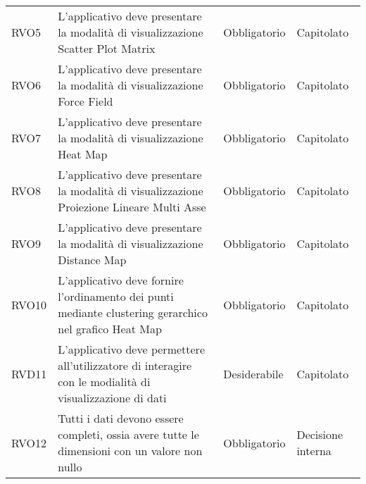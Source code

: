 \begin{longtable}[H]{>{\raggedright\arraybackslash}p{20mm} p{90mm} p{22mm} p{30mm}}
    RVO5
        & L'applicativo deve presentare la modalità di visualizzazione Scatter Plot Matrix
        & Obbligatorio
        & Capitolato \\

    RVO6
        & L'applicativo deve presentare la modalità di visualizzazione Force Field
        & Obbligatorio
        & Capitolato \\

    RVO7
        & L'applicativo deve presentare la modalità di visualizzazione Heat Map
        & Obbligatorio
        & Capitolato \\

    RVO8
        & L'applicativo deve presentare la modalità di visualizzazione Proiezione Lineare Multi Asse
        & Obbligatorio
        & Capitolato \\

    RVO9
        & L'applicativo deve presentare la modalità di visualizzazione Distance Map
        & Obbligatorio
        & Capitolato \\

    RVO10
        & L'applicativo deve fornire l'ordinamento dei punti mediante clustering gerarchico nel grafico Heat Map
        & Obbligatorio
        & Capitolato \\

    RVD11
        & L'applicativo deve permettere all'utilizzatore di interagire con le modialità di visualizzazione di dati
        & Desiderabile
        & Capitolato \\

    RVO12 &
        Tutti i dati devono essere completi, ossia avere tutte le dimensioni con un valore
        non nullo &
        Obbligatorio &
        Decisione interna \\
\end{longtable}
